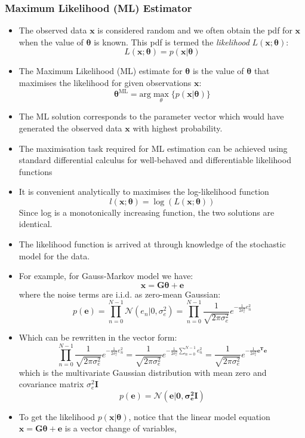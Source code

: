 \documentclass[12pt]{article}
\newcommand{\sigd}{\sigma^2}
\newcommand{\gau}{\mathcal{N}}
\newcommand{\thetab}{\boldsymbol{\theta}}
\newcommand{\xb}{\mathbf{x}}
\newcommand{\ml}{\textrm{ML}}
\begin{document}
\subsubsection{Maximum Likelihood (ML) Estimator}
\begin{itemize}
    \item The observed data $\mathbf{x}$ is considered random and we often obtain the pdf for $\mathbf{x}$ when the value of $\thetab$ is known. This pdf is termed the \textit{likelihood} $L(\xb;\thetab)$:
    \[
    L(\xb;\thetab) = p(\xb|\thetab)
    \]
    \item The Maximum Likelihood (ML) estimate for $\thetab$ is the value of $\thetab$ that maximises the likelihood for given observations $\xb$:
    \[
    \thetab^\ml = \textrm{arg}\max_{\theta}\{ p(\xb|\thetab)\}
    \]
    \item The ML solution corresponds to the parameter vector which would have generated the observed data $\mathbf{x}$ with highest probability.
    \item The maximisation task required for ML estimation can be achieved using standard differential calculus for well-behaved and differentiable likelihood functions 
    \item It is convenient analytically to maximises the log-likelihood function 
    \[l(\xb;\thetab) =\log( L(\xb;\thetab))\]
    Since log is a monotonically increasing function, the two solutions are identical.
    \item The likelihood function is arrived at through knowledge of the stochastic model for the data. 
    \item For example, for Gauss-Markov model we have:
    \[
    \mathbf{x = G \thetab + e}
    \]
    where the noise terms are i.i.d. as zero-mean Gaussian:
    \[
    p(\mathbf{e}) = \prod_{n=0}^{N-1}\gau(e_n | 0,\sigd_e) = \prod_{n=0}^{N-1}\frac{1}{\sqrt{2\pi \sigd_e}}e^{-\frac{1}{2\sigd_e}e^2_{n}}
    \]    
    \item Which can be rewritten in the vector form:
    \[
    \prod_{n=0}^{N-1}\frac{1}{\sqrt{2\pi \sigd_e}}e^{-\frac{1}{2\sigd_e}e^2_{n}} = \frac{1}{\sqrt{2\pi \sigd_e}}e^{-\frac{1}{2\sigd_e}\sum_{n=0}^{N-1}e^2_{n}} = \frac{1}{\sqrt{2\pi \sigd_e}}e^{-\frac{1}{2\sigd_e}\mathbf{e^T e}}
    \]
    which is the multivariate Gaussian distribution with mean zero and covariance matrix $\sigd_e \mathbf{I}$
    \[
    p(\mathbf{e}) = \gau (\mathbf{e|0,\sigd_e I})
    \]
    \item To get the likelihood $p(\mathbf{x} | \thetab)$, notice that the linear model equation $\mathbf{x = G\thetab + e}$ is a vector change of variables,

\end{itemize}
\end{document}
